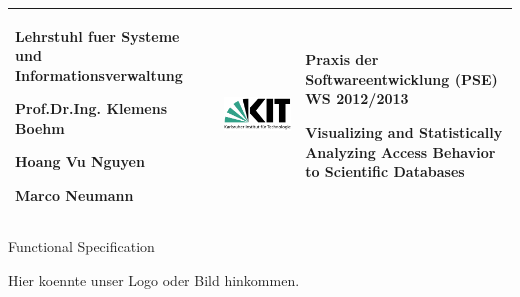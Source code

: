 \begin{titlepage}

\vspace*{-3cm}
\begin{center}

\begin{tabular}{m{5.5cm} m{5cm} m{5.5cm}}
\arrayrulecolor{PineGreen!90}

\begin{center}
\footnotesize{
\textbf{ Lehrstuhl fuer Systeme und Informationsverwaltung}
\newline

Prof.Dr.Ing. Klemens Boehm

Hoang Vu Nguyen

Marco Neumann
} 	
\end{center}
   & 
\begin{center}

   \includegraphics[width=0.9\linewidth]{Pictures/KIT-Logo.png}
   
\end{center}   
   & 
\begin{center}
\footnotesize{
\textbf{Praxis der Softwareentwicklung (PSE)}\newline
WS 2012/2013\newline

Visualizing and Statistically Analyzing Access Behavior to Scientific Databases
}
\end{center}\\
\hline
 
\end{tabular}


\vspace*{6cm}

\Huge
Functional Specification

\vspace*{2cm}
\normalsize
 Hier koennte unser Logo oder Bild hinkommen.


\vspace*{7cm}


\end{center}
\end{titlepage}
